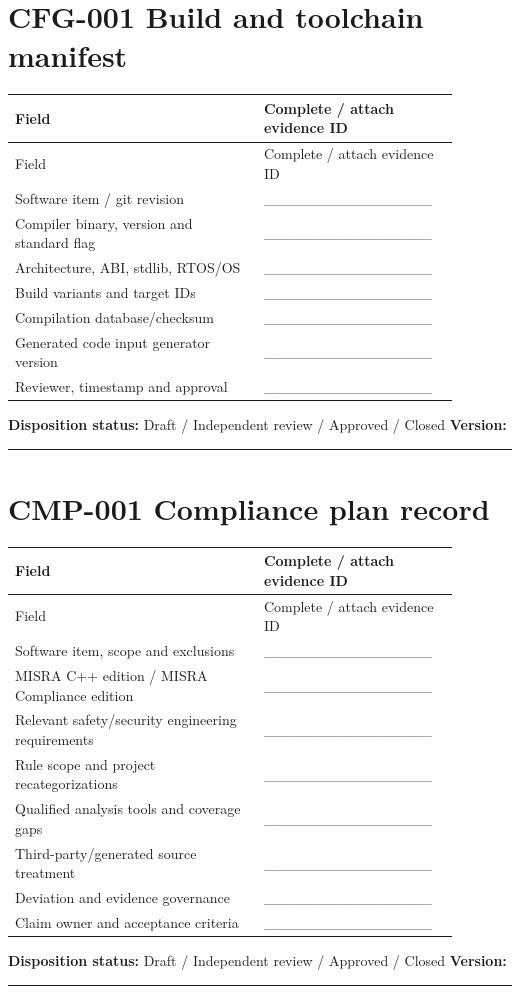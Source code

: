 \documentclass[10pt,letterpaper]{article}
\begin{document}
\section{CFG-001 Build and toolchain manifest}
\small\setlength{\tabcolsep}{3pt}\renewcommand{\arraystretch}{1.15}
\begin{longtable}{p{0.52\linewidth}p{0.36\linewidth}}
\toprule
Field & Complete / attach evidence ID\\ \midrule
\endfirsthead
\toprule
Field & Complete / attach evidence ID\\ \midrule
\endhead
Software item / git revision & \_\_\_\_\_\_\_\_\_\_\_\_\_\_\_\_\\
Compiler binary, version and standard flag & \_\_\_\_\_\_\_\_\_\_\_\_\_\_\_\_\\
Architecture, ABI, stdlib, RTOS/OS & \_\_\_\_\_\_\_\_\_\_\_\_\_\_\_\_\\
Build variants and target IDs & \_\_\_\_\_\_\_\_\_\_\_\_\_\_\_\_\\
Compilation database/checksum & \_\_\_\_\_\_\_\_\_\_\_\_\_\_\_\_\\
Generated code input generator version & \_\_\_\_\_\_\_\_\_\_\_\_\_\_\_\_\\
Reviewer, timestamp and approval & \_\_\_\_\_\_\_\_\_\_\_\_\_\_\_\_\\
\bottomrule
\end{longtable}
\normalsize
\textbf{Disposition status:} Draft / Independent review / Approved / Closed \quad \textbf{Version:} \rule{1.4cm}{0.4pt}

\section{CMP-001 Compliance plan record}
\small\setlength{\tabcolsep}{3pt}\renewcommand{\arraystretch}{1.15}
\begin{longtable}{p{0.52\linewidth}p{0.36\linewidth}}
\toprule
Field & Complete / attach evidence ID\\ \midrule
\endfirsthead
\toprule
Field & Complete / attach evidence ID\\ \midrule
\endhead
Software item, scope and exclusions & \_\_\_\_\_\_\_\_\_\_\_\_\_\_\_\_\\
MISRA C++ edition / MISRA Compliance edition & \_\_\_\_\_\_\_\_\_\_\_\_\_\_\_\_\\
Relevant safety/security engineering requirements & \_\_\_\_\_\_\_\_\_\_\_\_\_\_\_\_\\
Rule scope and project recategorizations & \_\_\_\_\_\_\_\_\_\_\_\_\_\_\_\_\\
Qualified analysis tools and coverage gaps & \_\_\_\_\_\_\_\_\_\_\_\_\_\_\_\_\\
Third-party/generated source treatment & \_\_\_\_\_\_\_\_\_\_\_\_\_\_\_\_\\
Deviation and evidence governance & \_\_\_\_\_\_\_\_\_\_\_\_\_\_\_\_\\
Claim owner and acceptance criteria & \_\_\_\_\_\_\_\_\_\_\_\_\_\_\_\_\\
\bottomrule
\end{longtable}
\normalsize
\textbf{Disposition status:} Draft / Independent review / Approved / Closed \quad \textbf{Version:} \rule{1.4cm}{0.4pt}
\end{document}
